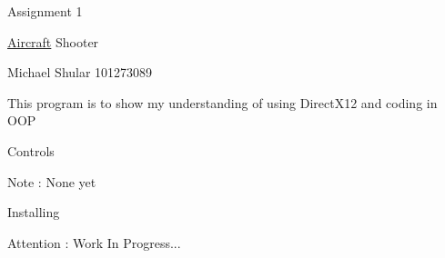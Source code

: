 Assignment 1

\mbox{\hyperlink{class_aircraft}{Aircraft}} Shooter

Michael Shular 101273089

This program is to show my understanding of using Direct\+X12 and coding in OOP

Controls \begin{DoxyNote}{Note}
\+: None yet
\end{DoxyNote}
Installing \begin{DoxyAttention}{Attention}
\+: Work In Progress... 
\end{DoxyAttention}
